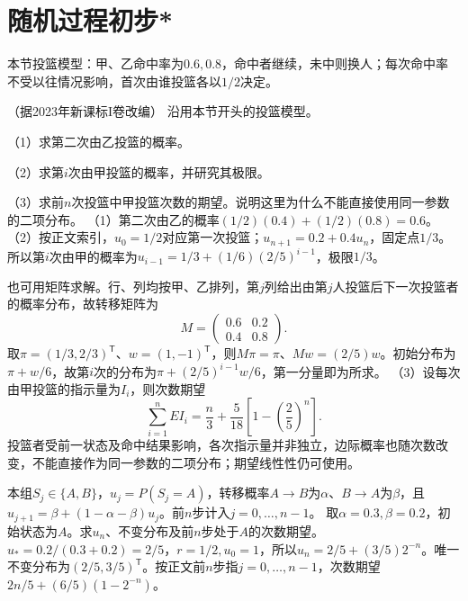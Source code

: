 \par\addvspace{12pt}

\section{随机过程初步*}

本节投篮模型：甲、乙命中率为\(0.6,0.8\)，命中者继续，未中则换人；每次命中率不受以往情况影响，首次由谁投篮各以\(1/2\)决定。

（据2023年新课标I卷改编）
沿用本节开头的投篮模型。

（1）求第二次由乙投篮的概率。

（2）求第\(i\)次由甲投篮的概率，并研究其极限。

（3）求前\(n\)次投篮中甲投篮次数的期望。说明这里为什么不能直接使用同一参数的二项分布。
\solutionanswer
（1）第二次由乙的概率\((1/2)(0.4)+(1/2)(0.8)=0.6\)。
（2）按正文索引，\(u_0=1/2\)对应第一次投篮；\(u_{n+1}=0.2+0.4u_n\)，固定点\(1/3\)。所以第\(i\)次由甲的概率为\(u_{i-1}=1/3+(1/6)(2/5)^{i-1}\)，极限\(1/3\)。

也可用矩阵求解。行、列均按甲、乙排列，第\(j\)列给出由第\(j\)人投篮后下一次投篮者的概率分布，故转移矩阵为
\[
 M=\begin{pmatrix}0.6&0.2\\0.4&0.8\end{pmatrix}.
\]
取\(\pi=(1/3,2/3)^{\mathsf T}\)、\(w=(1,-1)^{\mathsf T}\)，则\(M\pi=\pi\)、\(Mw=(2/5)w\)。初始分布为\(\pi+w/6\)，故第\(i\)次的分布为\(\pi+(2/5)^{i-1}w/6\)，第一分量即为所求。
（3）设每次由甲投篮的指示量为\(I_i\)，则次数期望
\[
 \sum_{i=1}^nEI_i=\frac n3+\frac5{18}\left[1-\left(\frac25\right)^n\right].
\]
投篮者受前一状态及命中结果影响，各次指示量并非独立，边际概率也随次数改变，不能直接作为同一参数的二项分布；期望线性性仍可使用。


本组\(S_j\in\{A,B\}\)，\(u_j=P(S_j=A)\)，转移概率\(A\to B\)为\(\alpha\)、\(B\to A\)为\(\beta\)，且\(u_{j+1}=\beta+(1-\alpha-\beta)u_j\)。前\(n\)步计入\(j=0,\ldots,n-1\)。
取\(\alpha=0.3,\beta=0.2\)，初始状态为\(A\)。求\(u_n\)、不变分布及前\(n\)步处于\(A\)的次数期望。
\solutionanswer
\(u_*=0.2/(0.3+0.2)=2/5\)，\(r=1/2,u_0=1\)，所以\(u_n=2/5+(3/5)2^{-n}\)。唯一不变分布为\((2/5,3/5)^{\mathsf T}\)。按正文前\(n\)步指\(j=0,\ldots,n-1\)，次数期望\(2n/5+(6/5)(1-2^{-n})\)。


